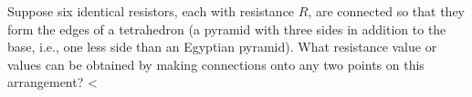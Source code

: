         Suppose six identical resistors, each with resistance
        $R$, are connected so that they form the edges of a
        tetrahedron (a pyramid with three sides in addition to the
        base, i.e., one less side than an Egyptian pyramid). What
        resistance value or values can be obtained by making
        connections onto any two points on this arrangement?
        <%
